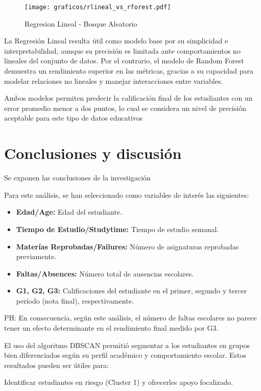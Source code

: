 \documentclass{article}
\begin{document}
\begin{figure}[H]
    \centering
    \texttt{[image: graficos/rlineal\_vs\_rforest.pdf]}
    \caption{Regresion Lineal - Bosque Aleatorio}
    \label{fig:rlineal_vs_rforest}
\end{figure}

La Regresión Lineal resulta útil como modelo base por su simplicidad e interpretabilidad, aunque su precisión es limitada ante comportamientos no lineales del conjunto de datos.
Por el contrario, el modelo de Random Forest demuestra un rendimiento superior en las métricas, gracias a su capacidad para modelar relaciones no lineales y manejar interacciones entre variables.


Ambos modelos permiten predecir la calificación final de los estudiantes con un error promedio menor a dos puntos, lo cual se considera un nivel de precisión aceptable para este tipo de datos educativos


\section{Conclusiones y discusión}

Se exponen las conclusiones de la investigación

Para este análisis, se han seleccionado como variables de interés las siguientes:
\begin{itemize}
    \item \textbf{Edad/Age:} Edad del estudiante.
    \item \textbf{Tiempo de Estudio/Studytime:} Tiempo de estudio semanal.
    \item \textbf{Materías Reprobadas/Failures:} Número de asignaturas reprobadas previamente.
    \item \textbf{Faltas/Absences:} Número total de ausencias escolares.
    \item \textbf{G1, G2, G3:} Calificaciones del estudiante en el primer, segundo y tercer período (nota final), respectivamente.
\end{itemize}


PH: En consecuencia, según este análisis, el número de faltas escolares no parece tener un efecto determinante en el rendimiento final medido por G3.


El uso del algoritmo DBSCAN permitió segmentar a los estudiantes en grupos bien diferenciados según su perfil académico y comportamiento escolar. Estos resultados pueden ser útiles para:

Identificar estudiantes en riesgo (Cluster 1) y ofrecerles apoyo focalizado.
\end{document}
